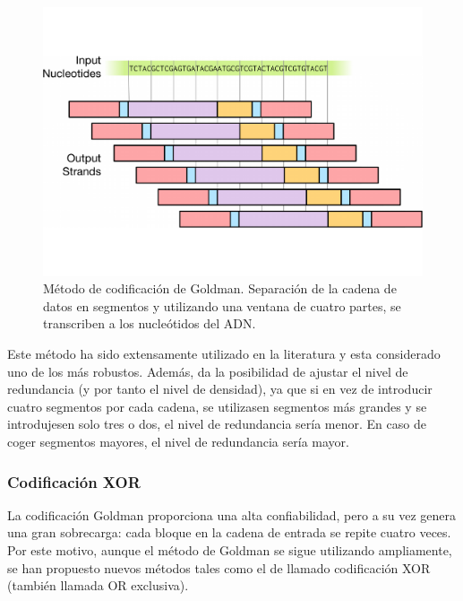 \documentclass[a4paper,11pt]{article}
\begin{document}
\begin{figure}[h!]
\begin{center}
\includegraphics[width=0.75\linewidth]{goldman-coding.pdf}
\caption{Método de codificación de Goldman. Separación de la cadena de datos en segmentos y utilizando una ventana de cuatro partes, se transcriben a los nucleótidos del ADN.}
\label{fig:goldmancoding}
\end{center}
\end{figure}

Este método ha sido extensamente utilizado en la literatura y esta considerado uno de los más robustos. Además, da la posibilidad de ajustar el nivel de redundancia (y por tanto el nivel de densidad), ya que si en vez de introducir cuatro segmentos por cada cadena, se utilizasen segmentos más grandes y se introdujesen solo tres o dos, el nivel de redundancia sería menor. En caso de coger segmentos mayores, el nivel de redundancia sería mayor.

\subsubsection{Codificación XOR}

La codificación Goldman proporciona una alta confiabilidad, pero a su vez genera una gran sobrecarga: cada bloque en la cadena de entrada se repite cuatro veces. Por este motivo, aunque el método de Goldman se sigue utilizando ampliamente, se han propuesto nuevos métodos tales como el de \cite{Bornholt2017} llamado codificación XOR (también llamada OR exclusiva).
\end{document}
